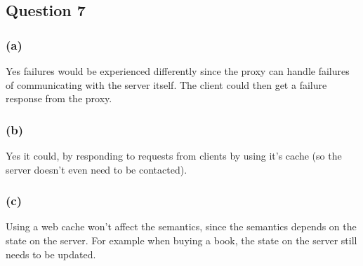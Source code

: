 \documentclass[12pt,a4paper]{article}
\begin{document}
\subsection{Question 7}
\subsubsection{(a)}
Yes failures would be experienced differently since the proxy can handle failures of communicating with the server itself.
The client could then get a failure response from the proxy.
\subsubsection{(b)}
Yes it could, by responding to requests from clients by using it's cache (so the server doesn't even need to be contacted).
\subsubsection{(c)}
Using a web cache won't affect the semantics, since the semantics depends on the state on the server.
For example when buying a book, the state on the server still needs to be updated.
\end{document}
